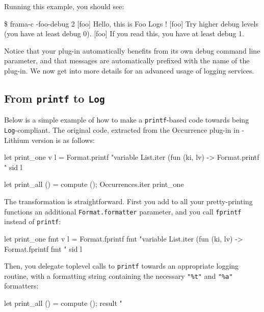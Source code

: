 Running this example, you should see:
\begin{shell}
\$ frama-c -foo-debug 2
[foo] Hello, this is Foo Logs !
[foo] Try higher debug levels (you have at least debug 0).
[foo] If you read this, you have at least debug 1.
\end{shell}

Notice that your plug-in automatically benefits from its own debug
command line parameter, and that messages are automatically prefixed
with the name of the plug-in. We now get into more details for an
advanced usage of logging services.

\subsection{From \texttt{printf} to \texttt{Log}}

Below is a simple example of how to make a \texttt{printf}-based code
towards being \texttt{Log}-compliant. The original code, extracted
from the \textsf{Occurrence} plug-in in \framac-\textsf{Lithium}
version is as follows:

\begin{ocamlcode}
let print_one v l =
  Format.printf "variable %
  List.iter
    (fun (ki, lv) ->
       Format.printf "  sid %
    l

let print_all () =
  compute ();
  Occurrences.iter print_one
\end{ocamlcode}

The transformation is straightforward. First you add to all your
pretty-printing functions an additional \texttt{Format.formatter}
parameter, and you call \texttt{fprintf} instead of \texttt{printf}:

\begin{ocamlcode}
let print_one fmt v l =
  Format.fprintf fmt "variable %
  List.iter
    (fun (ki, lv) ->
       Format.fprintf fmt "  sid %
    l
\end{ocamlcode}

Then, you delegate toplevel calls to \texttt{printf} towards an
appropriate logging routine, with a formatting string containing the
necessary \lstinline{"%t"} and \lstinline{"%a"} formatters:

\begin{ocamlcode}
let print_all () =
  compute ();
  result "%
\end{ocamlcode}

